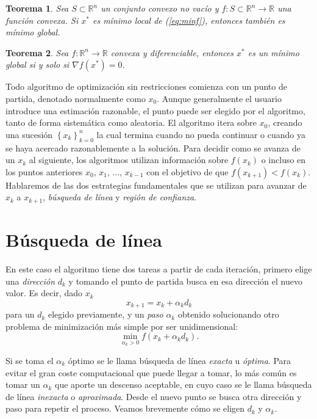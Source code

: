 \documentclass[11pt,a4paper]{book}
\newtheorem{theorem}{Teorema}[chapter]
\theoremstyle{definition}
\theoremstyle{remark}
\newcommand{\sucesionxk}{\left\{x_k\right\}}
\begin{document}
\begin{theorem}
	Sea $S \subset \mathbb{R}^n$ un conjunto convexo no vacío y
	$f:S \subset \mathbb{R}^n \rightarrow \mathbb{R}$ una función convexa. Si $x^*$ es mínimo local de (\ref{eq:minf}), entonces también es mínimo global.
\end{theorem}

\begin{theorem} \label{th:convx}
	Sea $f: \mathbb{R}^n \rightarrow \mathbb{R}$ convexa y diferenciable, entonces $x^*$ es un mínimo global si y solo si $\nabla f(x^*) = 0$.
\end{theorem}

Todo algoritmo de optimización sin restricciones comienza con un punto de partida, denotado normalmente como $x_{0}$. Aunque generalmente el usuario introduce una estimación razonable, el punto puede ser elegido por el algoritmo, tanto de forma sistemática como aleatoria. El algoritmo itera sobre $x_{0}$, creando una sucesión $\sucesionxk_{k=0}^n$ la cual termina cuando no pueda continuar o cuando ya se haya acercado razonablemente a la solución. Para decidir como se avanza de un $x_k$ al siguiente, los algoritmos utilizan información sobre $f(x_k)$ o incluso en los puntos anteriores $x_0,\, x_1,\, \ldots,\,x_{k-1}$ con el objetivo de que $f(x_{k+1})<f(x_{k})$. Hablaremos de las dos estrategias fundamentales que se utilizan para avanzar de $x_k$ a $x_{k+1}$, \textit{búsqueda de línea} y \textit{región de confianza}.

\section{Búsqueda de línea}

En este caso el algoritmo tiene dos tareas a partir de cada iteración, primero elige una \textit{dirección} $d_k$ y tomando el punto de partida busca en esa dirección el nuevo valor. Es decir, dado $x_k$
\begin{equation}
	\label{eq:linesearch}
	x_{k+1} = x_k + \alpha_kd_k
\end{equation}
para un $d_k$ elegido previamente, y un \textit{paso} $\alpha_k$ obtenido solucionando otro problema de minimización más simple por ser unidimensional:
\begin{equation}
	\min_{\alpha_k>0}f\left(x_k+\alpha_kd_k\right).
	\label{min:alphak}
\end{equation}

Si se toma el $\alpha_k$ óptimo se le llama búsqueda de línea \textit{exacta} u \textit{óptima}. Para evitar el gran coste computacional que puede llegar a tomar, lo más común es tomar un $\alpha_k$ que aporte un descenso aceptable, en cuyo caso se le llama búsqueda de línea \textit{inexacta} o \textit{aproximada}. Desde el nuevo punto se busca otra dirección y paso para repetir el proceso.
Veamos brevemente cómo se eligen $d_k$ y $\alpha_k$.
\end{document}
